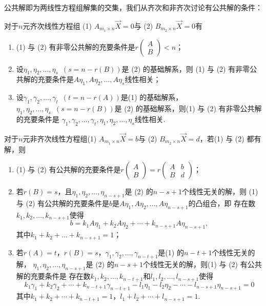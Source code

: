 公共解即为两线性方程组解集的交集，我们从齐次和非齐次讨论有公共解的条件：
\begin{theorem}
    对于$n$元齐次线性方程组 (1) $A_{m_1 \times n}\vec{X}=0$与 (2) $B_{m_2 \times n}\vec{X}=0$有
    \begin{enumerate}
        \item (1) 与 (2) 有非零公共解的充要条件是$r\begin{pmatrix}
                A \\ B
            \end{pmatrix}<n$；

        \item 设$\eta_1,\eta_2,\ldots,\eta_s\enspace(s=n-r(B))$是 (2) 的基础解系，则
        (1) 与 (2) 有非零公共解的充要条件是$A\eta_1,A\eta_2,\ldots,A\eta_s$线性相关；

        \item 设$\gamma_1,\gamma_2,\ldots,\gamma_t\enspace(t=n-r(A))$是(1) 的基础解系，
        $\eta_1,\eta_2,\ldots,\eta_s\enspace(s=n-r(B))$是 (2) 的基础解系，则(1) 与 (2) 有非零公共解的充要条件是
        $\gamma_1,\gamma_2,\ldots,\gamma_t,\eta_1,\eta_2,\ldots,\eta_s$线性相关.
    \end{enumerate}
\end{theorem}
\begin{theorem}
    对于$n$元非齐次线性方程组(1) $A_{m_1 \times n}\vec{X}=b$与 (2) $B_{m_2 \times n}\vec{X}=d$，若(1) 与 (2) 都有解，则
    \begin{enumerate}
        \item (1) 与 (2) 有公共解的充要条件是$r\begin{pmatrix}
                A \\ B
            \end{pmatrix}=r\begin{pmatrix}
                A & b \\ B & d
            \end{pmatrix}$；

        \item 若$r(B)=s$，且$\eta_1,\eta_2,\ldots,\eta_{n-s+1}$是 (2) 的$n-s+1$个线性无关的解，则
        (1) 与 (2) 有公共解的充要条件是$b$是$A\eta_1,A\eta_2,\ldots,A\eta_{n-s+1}$的凸组合，即
        存在数$k_1,k_2,\ldots,k_{n-s+1}$使得
        \[b=k_1A\eta_1+k_2A\eta_2+\cdots+k_{n-s+1}A\eta_{n-s+1},\]
        其中$k_1+k_2+\ldots+k_{n-s+1}=1$；

        \item 若$r(A)=t$，$r(B)=s$，$\gamma_1,\gamma_2,\ldots,\gamma_{n-t+1}$是(1) 的$n-t+1$个线性无关的解，
        $\eta_1,\eta_2,\ldots,\eta_{n-s+1}$是 (2) 的$n-s+1$个线性无关的解，则(1) 与 (2) 有公共解的充要条件是
        存在数$k_1,k_2,\ldots,k_{n-t+1}$和$l_1,l_2,\ldots,l_{n-s+1}$使得
        \[k_1\gamma_1+k_2\gamma_2+\cdots+k_{n-t+1}\gamma_{n-t+1}-l_1\eta_1-l_2\eta_2-\cdots-l_{n-s+1}\eta_{n-s+1}=0\]
        其中$k_1+k_2+\cdots+k_{n-t+1}=1$，$l_1+l_2+\cdots+l_{n-s+1}=1$.
    \end{enumerate}
\end{theorem}
